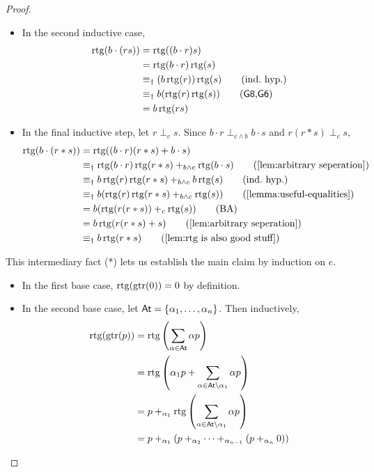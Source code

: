\documentclass[orivec,envcountsect,envcountsame]{llncs}
\begin{document}
\begin{proof}
\begin{itemize}
\begin{align*}
		\end{align*}
		\item In the second inductive case,
		\begin{align*}
			\rtg(b\cdot (rs)) &= \rtg((b\cdot r)s) \\
						&= \rtg(b\cdot r)\rtg(s) \\
						&\equiv_\dagger (b\rtg(r))\rtg(s) \tag{ind.~hyp.} \\
						&\equiv_\dagger b(\rtg(r)\rtg(s)) \tag{\textsf{G8},\textsf{G6}}  \\
						&= b\rtg(rs)
		\end{align*}
		\item In the final inductive step, let \(r \perp_c s\).
		Since \(b\cdot r \perp_{c\wedge b} b \cdot s\) and $r(r * s) \perp_c s$,
		\begin{align*}
			\rtg(b\cdot (r*s)) &= \rtg((b\cdot r)(r*s) + b\cdot s) \\
						&\equiv_\dagger \rtg(b\cdot r)\rtg(r*s) +_{b\wedge c}  \rtg(b\cdot s) \tag{\cref{lem:arbitrary seperation}} \\
						&\equiv_\dagger b\rtg(r)\rtg(r*s) +_{b\wedge c} b\rtg(s) \tag{ind.~hyp.}\\
						&\equiv_\dagger b(\rtg(r)\rtg(r*s) +_{b \wedge c}  \rtg(s)) \tag{\cref{lemma:useful-equalities}}\\
						&= b(\rtg(r(r*s)) +_{c} \rtg(s)) \tag{BA} \\
						&= b\rtg(r(r*s) + s) \tag{\cref{lem:arbitrary seperation}}\\
						&\equiv_\dagger b\rtg(r*s)  \tag{\cref{lem:rtg is also good stuff}}
		\end{align*}
	\end{itemize}
	This intermediary fact (*) lets us establish the main claim by induction on \(e\).
	\begin{itemize}
		\item In the first base case, \(\operatorname{rtg}(\operatorname{gtr}(0)) = 0\) by definition.
		\item In the second base case, let \(\mathsf{At} = \{\alpha_1, \dots, \alpha_n\}\). Then inductively,
		\begin{align*}
			\rtg(\gtr(p))
			&= \rtg\left(\sum_{\alpha \in \At} \alpha p\right)  \\
			&= \rtg\left(\alpha_1 p + \sum_{\alpha \in \At\setminus \alpha_1} \alpha p\right) \\
			&= p +_{\alpha_1} \rtg\left(\sum_{\alpha \in \At\setminus \alpha_1} \alpha p\right) \\
			&= p +_{\alpha_1} (p +_{\alpha_2} \cdots +_{\alpha_{n-1}} (p +_{\alpha_n} 0)) \\

\end{align*}
\end{itemize}
\end{proof}
\end{document}
